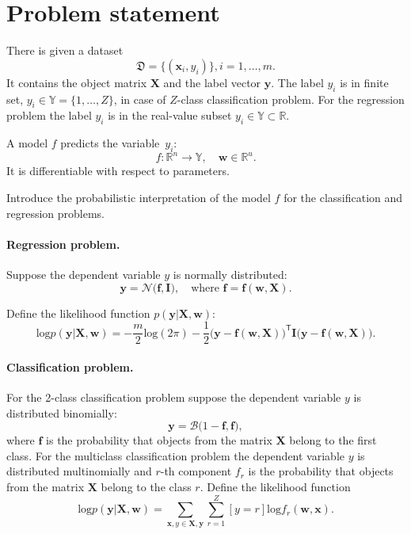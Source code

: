 \documentclass[smallextended]{svjour3}
\begin{document}
\section{Problem statement}
\label{prob_stat}
There is given a dataset \begin{equation}\label{eq:dataset}\mathfrak{D} = \{(\mathbf{x}_i,y_i)\}, i = 1,\dots,m.\end{equation} It contains the object matrix $\mathbf{X}$ and the label vector  $\mathbf{y}$. The label  ${y_i}$ is in finite set, ${y}_i \in \mathbb{Y} = \{1, \dots, Z\}$, in case of $Z$-class classification problem. For the regression problem the label $y_i$ is in the real-value subset ${y_i} \in \mathbb{Y} \subset  \mathbb{R}$.

A model $f$ predicts the variable~$y_i$:
\[
	f:\mathbb{R}^n \to \mathbb{Y}, \quad \mathbf{w} \in \mathbb{R}^u.
\]
It is differentiable with respect to parameters.

Introduce the probabilistic interpretation of the model $f$ for the classification and regression problems.

\paragraph{Regression problem.}
Suppose the dependent variable $y$ is normally distributed:
\begin{equation}
\label{eq:reg}
\mathbf{y} = \mathcal{N}\bigl(\mathbf{f}, \mathbf{I}\bigr),\quad \text{where }\mathbf{f} = \mathbf{f}(\mathbf{w}, \mathbf{X}).
\end{equation}


Define the likelihood function $p(\mathbf{y}|\mathbf{X}, \mathbf{w})$:
\[
	\text{log}p(\mathbf{y}|\mathbf{X}, \mathbf{w}) =-\frac{m}{2}\text{log}(2\pi)   -\frac{1}{2}\bigl(\mathbf{y} - \mathbf{f}(\mathbf{w}, \mathbf{X}))^\mathsf{T}\mathbf{I}(\mathbf{y} - \mathbf{f}(\mathbf{w}, \mathbf{X})\bigr).
\] 

\paragraph{Classification problem.}
For the 2-class classification problem suppose the dependent variable $y$  is distributed binomially:
\begin{equation}
\label{eq:cl}
	\mathbf{y} = \mathcal{B}\bigl(1-\mathbf{f}, \mathbf{f}\bigr),
\end{equation}
where  $\mathbf{f}$ is the probability that objects from the matrix $\mathbf{X}$  belong to the first class.
For the multiclass classification problem the  dependent variable $y$  is distributed multinomially and $r$-th component ${f}_r$ is the probability that objects from the matrix $\mathbf{X}$  belong to the class $r$. Define the likelihood function
\[
	\text{log}p(\mathbf{y}|\mathbf{X}, \mathbf{w}) = \sum_{\mathbf{x}, y \in \mathbf{X}, \mathbf{y}} \sum_{r=1}^Z[y=r] \text{log}{f}_r(\mathbf{w}, \mathbf{x}).
\] 
\end{document}
